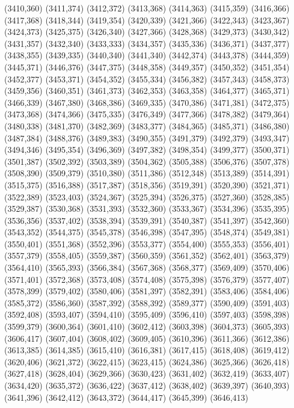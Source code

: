 (3410,360)
(3411,374)
(3412,372)
(3413,368)
(3414,363)
(3415,359)
(3416,366)
(3417,368)
(3418,344)
(3419,354)
(3420,339)
(3421,366)
(3422,343)
(3423,367)
(3424,373)
(3425,375)
(3426,340)
(3427,366)
(3428,368)
(3429,373)
(3430,342)
(3431,357)
(3432,340)
(3433,333)
(3434,357)
(3435,336)
(3436,371)
(3437,377)
(3438,355)
(3439,335)
(3440,340)
(3441,340)
(3442,374)
(3443,378)
(3444,359)
(3445,371)
(3446,376)
(3447,375)
(3448,358)
(3449,357)
(3450,352)
(3451,354)
(3452,377)
(3453,371)
(3454,352)
(3455,334)
(3456,382)
(3457,343)
(3458,373)
(3459,356)
(3460,351)
(3461,373)
(3462,353)
(3463,358)
(3464,377)
(3465,371)
(3466,339)
(3467,380)
(3468,386)
(3469,335)
(3470,386)
(3471,381)
(3472,375)
(3473,368)
(3474,366)
(3475,335)
(3476,349)
(3477,366)
(3478,382)
(3479,364)
(3480,338)
(3481,370)
(3482,369)
(3483,377)
(3484,365)
(3485,371)
(3486,380)
(3487,384)
(3488,376)
(3489,383)
(3490,355)
(3491,379)
(3492,379)
(3493,347)
(3494,346)
(3495,354)
(3496,369)
(3497,382)
(3498,354)
(3499,377)
(3500,371)
(3501,387)
(3502,392)
(3503,389)
(3504,362)
(3505,388)
(3506,376)
(3507,378)
(3508,390)
(3509,379)
(3510,380)
(3511,386)
(3512,348)
(3513,389)
(3514,391)
(3515,375)
(3516,388)
(3517,387)
(3518,356)
(3519,391)
(3520,390)
(3521,371)
(3522,389)
(3523,403)
(3524,367)
(3525,394)
(3526,375)
(3527,360)
(3528,385)
(3529,387)
(3530,368)
(3531,393)
(3532,360)
(3533,367)
(3534,396)
(3535,395)
(3536,356)
(3537,402)
(3538,394)
(3539,391)
(3540,387)
(3541,397)
(3542,360)
(3543,352)
(3544,375)
(3545,378)
(3546,398)
(3547,395)
(3548,374)
(3549,381)
(3550,401)
(3551,368)
(3552,396)
(3553,377)
(3554,400)
(3555,353)
(3556,401)
(3557,379)
(3558,405)
(3559,387)
(3560,359)
(3561,352)
(3562,401)
(3563,379)
(3564,410)
(3565,393)
(3566,384)
(3567,368)
(3568,377)
(3569,409)
(3570,406)
(3571,401)
(3572,368)
(3573,408)
(3574,408)
(3575,398)
(3576,379)
(3577,407)
(3578,399)
(3579,402)
(3580,406)
(3581,397)
(3582,391)
(3583,406)
(3584,406)
(3585,372)
(3586,360)
(3587,392)
(3588,392)
(3589,377)
(3590,409)
(3591,403)
(3592,408)
(3593,407)
(3594,410)
(3595,409)
(3596,410)
(3597,403)
(3598,398)
(3599,379)
(3600,364)
(3601,410)
(3602,412)
(3603,398)
(3604,373)
(3605,393)
(3606,417)
(3607,404)
(3608,402)
(3609,405)
(3610,396)
(3611,366)
(3612,386)
(3613,385)
(3614,385)
(3615,410)
(3616,381)
(3617,415)
(3618,408)
(3619,412)
(3620,406)
(3621,372)
(3622,415)
(3623,415)
(3624,386)
(3625,366)
(3626,418)
(3627,418)
(3628,404)
(3629,366)
(3630,423)
(3631,402)
(3632,419)
(3633,407)
(3634,420)
(3635,372)
(3636,422)
(3637,412)
(3638,402)
(3639,397)
(3640,393)
(3641,396)
(3642,412)
(3643,372)
(3644,417)
(3645,399)
(3646,413)
